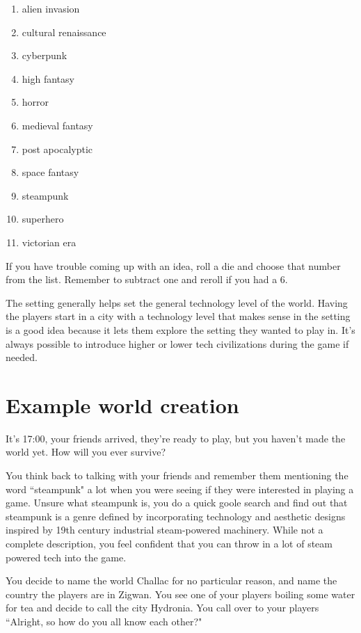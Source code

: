 \begin{enumerate}

    \item{alien invasion}
    \item{cultural renaissance}
    \item{cyberpunk}
    \item{high fantasy}
    \item{horror}
    \item{medieval fantasy}
    \item{post apocalyptic}
    \item{space fantasy}
    \item{steampunk}
    \item{superhero}
    \item{victorian era}

\end{enumerate}

If you have trouble coming up with an idea, roll a die and choose that number
from the list. Remember to subtract one and reroll if you had a 6.

The setting generally helps set the general technology level of the world.
Having the players start in a city with a technology level that makes sense
in the setting is a good idea because it lets them explore the setting they
wanted to play in. It's always possible to introduce higher or lower tech
civilizations during the game if needed.

\section*{Example world creation}

It's 17:00, your friends arrived, they're ready to play, but you haven't made
the world yet. How will you ever survive?

You think back to talking with your friends and remember them mentioning the
word ``steampunk" a lot when you were seeing if they were interested in playing
a game. Unsure what steampunk is, you do a quick goole search and find out that
steampunk is a genre defined by incorporating technology and aesthetic designs
inspired by 19th century industrial steam-powered machinery. While not a
complete description, you feel confident that you can throw in a lot of steam
powered tech into the game.

You decide to name the world Challac for no particular reason, and name the
country the players are in Zigwan. You see one of your players boiling some
water for tea and decide to call the city Hydronia. You call over to your
players ``Alright, so how do you all know each other?"


